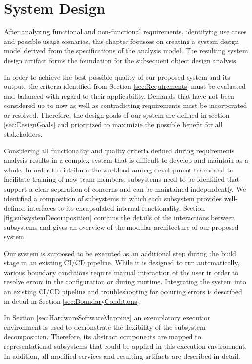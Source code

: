 \chapter{System Design}
\label{ch:SystemDesign}

After analyzing functional and non-functional requirements, identifying use cases and possible usage scenarios, this chapter focusses on creating a system design model derived from the specifications of the analysis model. The resulting system design artifact forms the foundation for the subsequent object design analysis.

In order to achieve the best possible quality of our proposed system and its output, the criteria identified from Section \ref{sec:Requirements} must be evaluated and balanced with regard to their applicability. Demands that have not been considered up to now as well as contradicting requirements must be incorporated or resolved. Therefore, the design goals of our system are defined in section \ref{sec:DesignGoals} and prioritized to maximizie the possible benefit for all stakeholders. 

Considering all functionality and quality criteria defined during requirements analysis results in a complex system that is difficult to develop and maintain as a whole. In order to distribute the workload among development teams and to facilitate training of new team members, subsystems need to be identified that support a clear separation of concerns and can be maintained independently. We identified a composition of subsystems in which each subsystem provides well-defined interfaces to its encapsulated internal functionality. Section \ref{fig:subsystemDecomposition} contains the details of the interactions between subsystems and gives an overview of the modular architecture of our proposed system.

Our system is supposed to be executed as an additional step during the build stage in an existing CI/CD pipeline. While it is designed to run automatically, various boundary conditions require manual interaction of the user in order to resolve errors in the configuration or during runtime. Integrating the system into an existing CI/CD pipeline and troubleshooting for occuring errors is described in detail in Section \ref{sec:BoundaryConditions}.

In Section \ref{sec:HardwareSoftwareMapping} an exemplatory execution environment is used to demonstrate the flexibility of the subsystem decomposition. Therefore, its abstract components are mapped to representational subsystems that could be applied in this execution environment. In addition, all modified services and resulting artifacts are described in detail.
\newpage

\newpage



